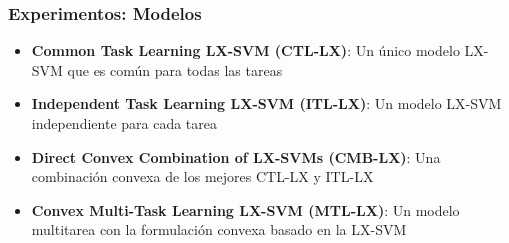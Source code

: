 \documentclass[aspectratio=43,spanish]{beamer}
\newcommand{\fmaxn}[1]{\textbf{#1}}
\newcommand{\fmod}[1]{\textsf{#1}}
\begin{document}



\begin{frame}
      \frametitle{Experimentos: Modelos}
  
  \begin{itemize}
      \item \textbf{Common Task Learning LX-SVM (\fmod{CTL-LX})}: Un único modelo LX-SVM que es común para todas las tareas
      \item \textbf{Independent Task Learning LX-SVM (\fmod{ITL-LX})}: Un modelo LX-SVM independiente para cada tarea
      \item \textbf{Direct Convex Combination of LX-SVMs (\fmod{CMB-LX})}: Una combinación convexa de los mejores \fmod{CTL-LX} y \fmod{ITL-LX}
      \item \textbf{Convex Multi-Task Learning LX-SVM (\fmod{MTL-LX})}: Un modelo multitarea con la formulación convexa basado en la LX-SVM
  
  \end{itemize}   
  
  \end{frame}
  
\end{document}
